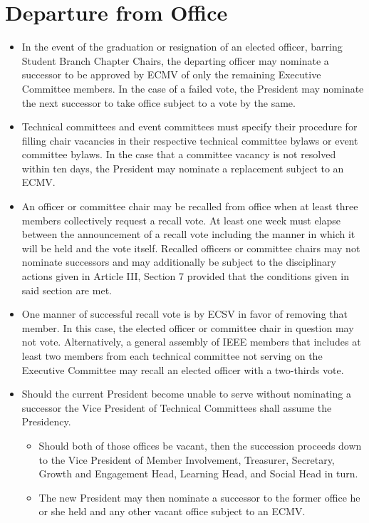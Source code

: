 \documentclass[12pt]{constitution}
\begin{document}
\section{Departure from Office}
\label{sec:exec_depart}
\begin{itemize}
    \item In the event of the graduation or resignation of an elected officer, barring Student Branch Chapter Chairs, the departing officer may nominate a successor to be approved by ECMV of only the remaining Executive Committee members. In the case of a failed vote, the President may nominate the next successor to take office subject to a vote by the same.
    \item Technical committees and event committees must specify their procedure for filling chair vacancies in their respective technical committee bylaws or event committee bylaws. In the case that a committee vacancy is not resolved within ten days, the President may nominate a replacement subject to an ECMV.
    \item An officer or committee chair may be recalled from office when at least three members collectively request a recall vote. At least one week must elapse between the announcement of a recall vote including the manner in which it will be held and the vote itself. Recalled officers or committee chairs may not nominate successors and may additionally be subject to the disciplinary actions given in Article III, Section 7 provided that the conditions given in said section are met.
    \item One manner of successful recall vote is by ECSV in favor of removing that member. In this case, the elected officer or committee chair in question may not vote. Alternatively, a general assembly of IEEE members that includes at least two members from each technical committee not serving on the Executive Committee may recall an elected officer with a two-thirds vote.
    \item Should the current President become unable to serve without nominating a successor the Vice President of Technical Committees shall assume the Presidency.
    \begin{itemize}
        \item Should both of those offices be vacant, then the succession proceeds down to the Vice President of Member Involvement, Treasurer, Secretary, Growth and Engagement Head, Learning Head, and Social Head in turn.
        \item The new President may then nominate a successor to the former office he or she held and any other vacant office subject to an ECMV.
    \end{itemize}
\end{itemize}
\end{document}
